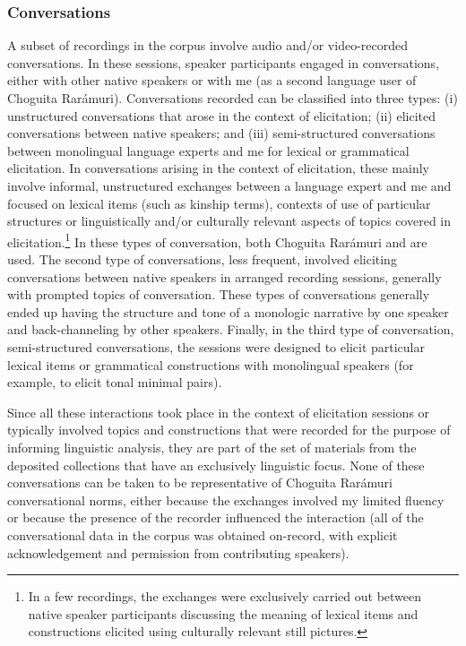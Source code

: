 \subsubsection{Conversations}
\label{subsubsec: conversation}
\largerpage
A subset of recordings in the corpus involve audio and/or video-recorded conversations. In these sessions, speaker participants engaged in conversations, either with other native speakers or with me (as a second language user of Choguita Rarámuri). Conversations recorded can be classified into three types: (i) unstructured conversations that arose in the context of elicitation; (ii) elicited conversations between native speakers; and (iii) semi-structured conversations between monolingual language experts and me for lexical or grammatical elicitation. In conversations arising in the context of elicitation, these mainly involve informal, unstructured exchanges between a language expert and me and focused on lexical items (such as kinship terms), contexts of use of particular structures or linguistically and/or culturally relevant aspects of topics covered in elicitation.\footnote{In a few recordings, the exchanges were exclusively carried out between native speaker participants discussing the meaning of lexical items and constructions elicited using culturally relevant still pictures.} In these types of conversation, both Choguita Rarámuri and  are used. The second type of conversations, less frequent, involved eliciting conversations between native speakers in arranged recording sessions, generally with prompted topics of conversation. These types of conversations generally ended up having the structure and tone of a monologic narrative by one speaker and back-channeling by other speakers. Finally, in the third type of conversation, semi-structured conversations, the sessions were designed to elicit particular lexical items or grammatical constructions with monolingual speakers (for example, to elicit tonal minimal pairs).

Since all these interactions took place in the context of elicitation sessions or typically involved topics and constructions that were recorded for the purpose of informing linguistic analysis, they are part of the set of materials from the deposited collections that have an exclusively linguistic focus. None of these conversations can be taken to be representative of Choguita Rarámuri conversational norms, either because the exchanges involved my limited fluency or because the presence of the recorder influenced the interaction (all of the conversational data in the corpus was obtained on-record, with explicit acknowledgement and permission from contributing speakers).

